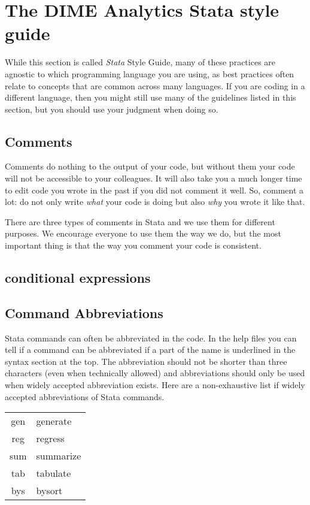 \section{The DIME Analytics Stata style guide}

While this section is called \textit{Stata} Style Guide, many of these practices are agnostic to which
programming language you are using, as best practices often relate to concepts that are common across many
languages. If you are coding in a different language, then you might still use many of the guidelines
listed in this section, but you should use your judgment when doing so.

\subsection{Comments}

Comments do nothing to the output of your code, but without them your code will not be accessible to your colleagues.
It will also take you a much longer time to edit code you wrote in the past if you did not comment it well.
So, comment a lot: do not only write \textit{what} your code is doing but also \textit{why} you wrote it like that.

There are three types of comments in Stata and we use them for different purposes.
 We encourage everyone to use them the way we do,
 but the most important thing is that the way you comment your code is consistent.


\subsection{conditional expressions}
\subsection{Command Abbreviations}

Stata commands can often be abbreviated in the code. In the help files you can tell if a command can be 
abbreviated if a part of the name is underlined in the syntax section at the top. The abbreviation should not 
be shorter than three characters (even when technically allowed) and abbreviations should only be used when 
widely accepted abbreviation exists. Here are a non-exhaustive list if widely accepted abbreviations of Stata commands.

\begin{center}
	\begin{tabular}{ c | l }
		\hline
		gen & generate \\
		reg & regress \\
		sum & summarize \\
		tab & tabulate \\
		bys & bysort \\
		\hline
	\end{tabular}
\end{center}

